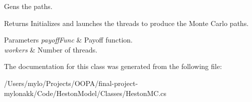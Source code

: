 Gens the paths. 

\begin{DoxyReturn}{Returns}
Initializes and launches the threads to produce the Monte Carlo paths.
\end{DoxyReturn}

\begin{DoxyParams}{Parameters}
{\em payoff\+Func} & Payoff function.\\
\hline
{\em workers} & Number of threads.\\
\hline
\end{DoxyParams}


The documentation for this class was generated from the following file\+:\begin{DoxyCompactItemize}
\item 
/\+Users/mylo/\+Projects/\+O\+O\+P\+A/final-\/project-\/mylonakk/\+Code/\+Heston\+Model/\+Classes/Heston\+M\+C.\+cs\end{DoxyCompactItemize}
